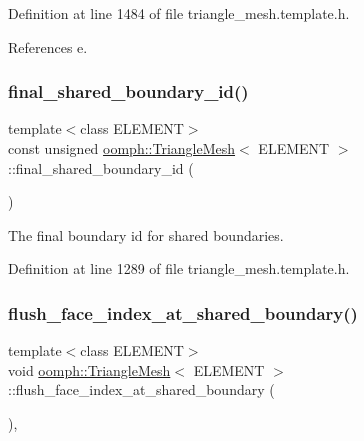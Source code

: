 Definition at line 1484 of file triangle\+\_\+mesh.\+template.\+h.



References e.

\mbox{\label{classoomph_1_1TriangleMesh_aa0f608107023deae643f7bbde1882241}} 
\subsubsection{\texorpdfstring{final\+\_\+shared\+\_\+boundary\+\_\+id()}{final\_shared\_boundary\_id()}}
{\footnotesize\ttfamily template$<$class E\+L\+E\+M\+E\+NT$>$ \\
const unsigned \hyperlink{classoomph_1_1TriangleMesh}{oomph\+::\+Triangle\+Mesh}$<$ E\+L\+E\+M\+E\+NT $>$\+::final\+\_\+shared\+\_\+boundary\+\_\+id (\begin{DoxyParamCaption}{ }\end{DoxyParamCaption})\hspace{0.3cm}{\ttfamily [inline]}}



The final boundary id for shared boundaries. 



Definition at line 1289 of file triangle\+\_\+mesh.\+template.\+h.

\mbox{\label{classoomph_1_1TriangleMesh_ad1313569fdd378c04b4a0e136adf7e46}} 
\subsubsection{\texorpdfstring{flush\+\_\+face\+\_\+index\+\_\+at\+\_\+shared\+\_\+boundary()}{flush\_face\_index\_at\_shared\_boundary()}}
{\footnotesize\ttfamily template$<$class E\+L\+E\+M\+E\+NT$>$ \\
void \hyperlink{classoomph_1_1TriangleMesh}{oomph\+::\+Triangle\+Mesh}$<$ E\+L\+E\+M\+E\+NT $>$\+::flush\+\_\+face\+\_\+index\+\_\+at\+\_\+shared\+\_\+boundary (\begin{DoxyParamCaption}{ }\end{DoxyParamCaption})\hspace{0.3cm}{\ttfamily [inline]}, {\ttfamily [protected]}}



